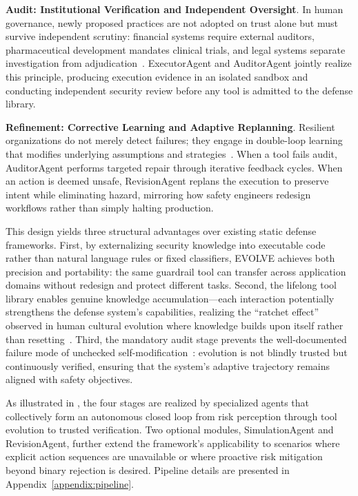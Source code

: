    \textbf{Audit: Institutional Verification and Independent Oversight}. In human governance, newly proposed practices are not adopted on trust alone but must survive independent scrutiny: financial systems require external auditors, pharmaceutical development mandates clinical trials, and legal systems separate investigation from adjudication~\citep{taleb2012things,shore2015audit}. ExecutorAgent and AuditorAgent jointly realize this principle, producing execution evidence in an isolated sandbox and conducting independent security review before any tool is admitted to the defense library.

   \textbf{Refinement: Corrective Learning and Adaptive Replanning}. Resilient organizations do not merely detect failures; they engage in double-loop learning that modifies underlying assumptions and strategies~\citep{argyris1997organizational,senge1990art}. When a tool fails audit, AuditorAgent performs targeted repair through iterative feedback cycles. When an action is deemed unsafe, RevisionAgent replans the execution to preserve intent while eliminating hazard, mirroring how safety engineers redesign workflows rather than simply halting production.

  This design yields three structural advantages over existing static defense frameworks. First, by externalizing security knowledge into executable code rather than natural language rules or fixed classifiers, EVOLVE achieves both precision and portability: the same guardrail tool can transfer across application domains without redesign and protect different tasks. Second, the lifelong tool library enables genuine knowledge accumulation---each interaction potentially strengthens the defense system's capabilities, realizing the ``ratchet effect'' observed in human cultural evolution where knowledge builds upon itself rather than resetting~\citep{tomasello2009cultural}. Third, the mandatory audit stage prevents the well-documented failure mode of unchecked self-modification~\citep{amodei2016concrete}: evolution is not blindly trusted but continuously verified, ensuring that the system's adaptive trajectory remains aligned with safety objectives.

  As illustrated in , the four stages are realized by specialized agents that collectively form an autonomous closed loop from risk perception through tool evolution to trusted verification. Two optional modules, SimulationAgent and RevisionAgent, further extend the framework's applicability to scenarios where explicit action sequences are unavailable or where proactive risk mitigation beyond binary rejection is desired. Pipeline details are presented in Appendix~\ref{appendix:pipeline}.

